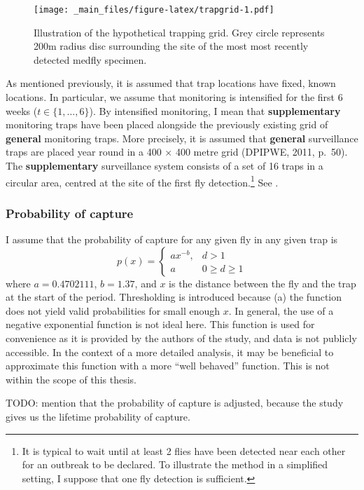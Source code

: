 \documentclass[
  oneside]{book}
\begin{document}
\begin{figure}
\centering
\texttt{[image: \_main\_files/figure-latex/trapgrid-1.pdf]}
\caption{\label{fig:trapgrid}Illustration of the hypothetical trapping grid. Grey circle represents 200m radius disc surrounding the site of the most most recently detected medfly specimen.}
\end{figure}

As mentioned previously, it is assumed that trap locations have fixed, known locations. In particular, we assume that monitoring is intensified for the first 6 weeks (\(t \in \{1, \ldots, 6\}\)). By intensified monitoring, I mean that \textbf{supplementary} monitoring traps have been placed alongside the previously existing grid of \textbf{general} monitoring traps. More precisely, it is assumed that \textbf{general} surveillance traps are placed year round in a 400 \(\times\) 400 metre grid (DPIPWE, 2011, p.~50). The \textbf{supplementary} surveillance system consists of a set of 16 traps in a circular area, centred at the site of the first fly detection.\footnote{It is typical to wait until at least 2 flies have been detected near each other for an outbreak to be declared. To illustrate the method in a simplified setting, I suppose that one fly detection is sufficient.} See \citet{trapgrid}.

\hypertarget{probability-of-capture}{%
\subsubsection{Probability of capture}\label{probability-of-capture}}

I assume that the probability of capture for any given fly in any given trap is
\[
p(x) = \begin{cases}ax^{-b}, & d>1 \\ a & 0 \geq d \geq 1\end{cases}
\]
where \(a = 0.4702111\), \(b = 1.37\), and \(x\) is the distance between the fly and the trap at the start of the period. Thresholding is introduced because (a) the function does not yield valid probabilities for small enough \(x\). In general, the use of a negative exponential function is not ideal here. This function is used for convenience as it is provided by the authors of the study, and data is not publicly accessible. In the context of a more detailed analysis, it may be beneficial to approximate this function with a more ``well behaved'' function. This is not within the scope of this thesis.

TODO: mention that the probability of capture is adjusted, because the study gives us the lifetime probability of capture.
\end{document}
